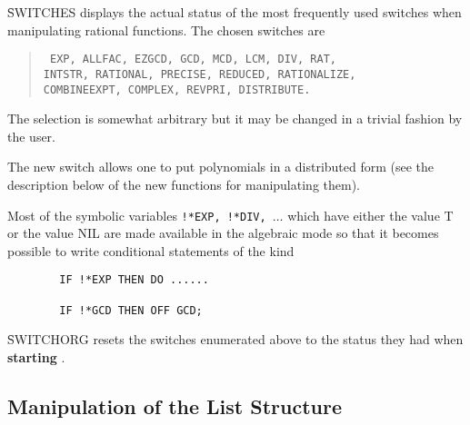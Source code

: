 \f{SWITCHES} displays the actual status of the most frequently used switches
when manipulating rational functions. The chosen switches are
\begin{quote}\tt
  EXP, ALLFAC, EZGCD, GCD, MCD, LCM, DIV, RAT, \\
  INTSTR, RATIONAL, PRECISE, REDUCED, RATIONALIZE, \\
  COMBINEEXPT, COMPLEX, REVPRI, DISTRIBUTE.
\end{quote}

The selection is somewhat arbitrary but it may be changed in a trivial
fashion by the user.

\hypertarget{switch:DISTRIBUTE}{}
The new switch  allows one to put polynomials in a
distributed form (see the description below of
the new functions for manipulating them).

Most of the symbolic variables {\tt !*EXP, !*DIV, $\ldots$}
which have either the value T or the value NIL are made available in the
algebraic mode so that it becomes possible to write conditional
statements of the kind
\begin{verbatim}
        IF !*EXP THEN DO ......

        IF !*GCD THEN OFF GCD;
\end{verbatim}
\f{SWITCHORG} resets  the switches enumerated above to the status
they had when {\bf starting} \REDUCE.
\subsection{Manipulation of the List Structure}

